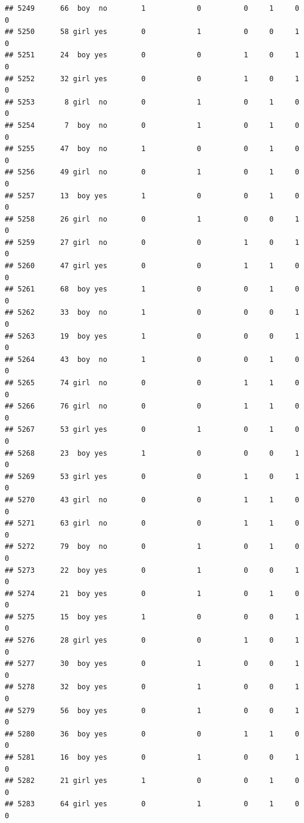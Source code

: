 \documentclass[man]{apa6}
\begin{document}
\begin{verbatim}
## 5249      66  boy  no        1            0          0     1     0     0
## 5250      58 girl yes        0            1          0     0     1     0
## 5251      24  boy yes        0            0          1     0     1     0
## 5252      32 girl yes        0            0          1     0     1     0
## 5253       8 girl  no        0            1          0     1     0     0
## 5254       7  boy  no        0            1          0     1     0     0
## 5255      47  boy  no        1            0          0     1     0     0
## 5256      49 girl  no        0            1          0     1     0     0
## 5257      13  boy yes        1            0          0     1     0     0
## 5258      26 girl  no        0            1          0     0     1     0
## 5259      27 girl  no        0            0          1     0     1     0
## 5260      47 girl yes        0            0          1     1     0     0
## 5261      68  boy yes        1            0          0     1     0     0
## 5262      33  boy  no        1            0          0     0     1     0
## 5263      19  boy yes        1            0          0     0     1     0
## 5264      43  boy  no        1            0          0     1     0     0
## 5265      74 girl  no        0            0          1     1     0     0
## 5266      76 girl  no        0            0          1     1     0     0
## 5267      53 girl yes        0            1          0     1     0     0
## 5268      23  boy yes        1            0          0     0     1     0
## 5269      53 girl yes        0            0          1     0     1     0
## 5270      43 girl  no        0            0          1     1     0     0
## 5271      63 girl  no        0            0          1     1     0     0
## 5272      79  boy  no        0            1          0     1     0     0
## 5273      22  boy yes        0            1          0     0     1     0
## 5274      21  boy yes        0            1          0     1     0     0
## 5275      15  boy yes        1            0          0     0     1     0
## 5276      28 girl yes        0            0          1     0     1     0
## 5277      30  boy yes        0            1          0     0     1     0
## 5278      32  boy yes        0            1          0     0     1     0
## 5279      56  boy yes        0            1          0     0     1     0
## 5280      36  boy yes        0            0          1     1     0     0
## 5281      16  boy yes        0            1          0     0     1     0
## 5282      21 girl yes        1            0          0     1     0     0
## 5283      64 girl yes        0            1          0     1     0     0

\end{verbatim}
\end{document}
